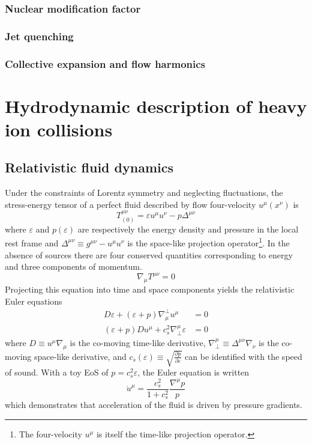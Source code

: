\subsubsection{Nuclear modification factor}
\subsubsection{Jet quenching}
\subsubsection{Collective expansion and flow harmonics}


\section{Hydrodynamic description of heavy ion collisions}

\subsection{Relativistic fluid dynamics}

Under the constraints of Lorentz symmetry and neglecting fluctuations, the stress-energy tensor of a perfect fluid described by flow four-velocity $u^\mu(x^\nu)$ is
\begin{equation}
T^{\mu\nu}_{(0)} = \varepsilon u^\mu u^\nu - p \Delta^{\mu\nu}
\end{equation}
where $\varepsilon$ and $p(\varepsilon)$ are respectively the energy density and pressure in the local rest frame and \( \Delta^{\mu\nu} \equiv g^{\mu\nu} - u^\mu u^\nu \) is the space-like projection operator\footnote{The four-velocity $u^\mu$ is itself the time-like projection operator.}.
In the absence of sources there are four conserved quantities corresponding to energy and three components of momentum.
\begin{equation}
  \label{eq:em_cons}
  \nabla_\mu T^{\mu\nu} = 0
\end{equation}
Projecting this equation into time and space components yields the relativistic Euler equations
\begin{align}
  D\varepsilon + \left(\varepsilon + p\right)\nabla^\perp_\mu u^\mu &= 0 \\
  \left(\varepsilon + p\right)Du^\mu + c_s^2 \nabla_\perp^\mu \varepsilon &= 0 
\end{align}
where \(D \equiv u^\mu \nabla_\mu\) is the co-moving time-like derivative, \( \nabla_\perp^\mu \equiv \Delta^{\mu\nu} \nabla_\nu \) is the co-moving space-like derivative, and \(c_s(\varepsilon) \equiv \sqrt{\frac{\partial p}{\partial \varepsilon}} \) can be identified with the speed of sound.
With a toy \ac{EoS} of $p = c_s^2 \varepsilon$, the Euler equation is written
\begin{equation}
\dot{u}^\mu = \frac{c_s^2}{1+c_s^2} \frac{\nabla^\mu p}{p}
\end{equation}
which demonstrates that acceleration of the fluid is driven by pressure gradients.

